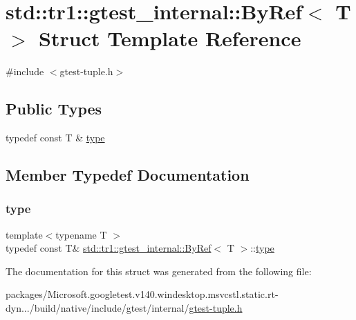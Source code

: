 \hypertarget{structstd_1_1tr1_1_1gtest__internal_1_1_by_ref}{}\section{std\+::tr1\+::gtest\+\_\+internal\+::By\+Ref$<$ T $>$ Struct Template Reference}
\label{structstd_1_1tr1_1_1gtest__internal_1_1_by_ref}


{\ttfamily \#include $<$gtest-\/tuple.\+h$>$}

\subsection*{Public Types}
\begin{DoxyCompactItemize}
\item 
typedef const T \& \mbox{\hyperlink{structstd_1_1tr1_1_1gtest__internal_1_1_by_ref_ac42ad942ee1cfa86b2abcce9b88ac10e}{type}}
\end{DoxyCompactItemize}


\subsection{Member Typedef Documentation}
\mbox{\label{structstd_1_1tr1_1_1gtest__internal_1_1_by_ref_ac42ad942ee1cfa86b2abcce9b88ac10e}} 
\subsubsection{\texorpdfstring{type}{type}}
{\footnotesize\ttfamily template$<$typename T $>$ \\
typedef const T\& \mbox{\hyperlink{structstd_1_1tr1_1_1gtest__internal_1_1_by_ref}{std\+::tr1\+::gtest\+\_\+internal\+::\+By\+Ref}}$<$ T $>$\+::\mbox{\hyperlink{structstd_1_1tr1_1_1gtest__internal_1_1_by_ref_ac42ad942ee1cfa86b2abcce9b88ac10e}{type}}}



The documentation for this struct was generated from the following file\+:\begin{DoxyCompactItemize}
\item 
packages/\+Microsoft.\+googletest.\+v140.\+windesktop.\+msvcstl.\+static.\+rt-\/dyn.../build/native/include/gtest/internal/\mbox{\hyperlink{gtest-tuple_8h}{gtest-\/tuple.\+h}}\end{DoxyCompactItemize}
